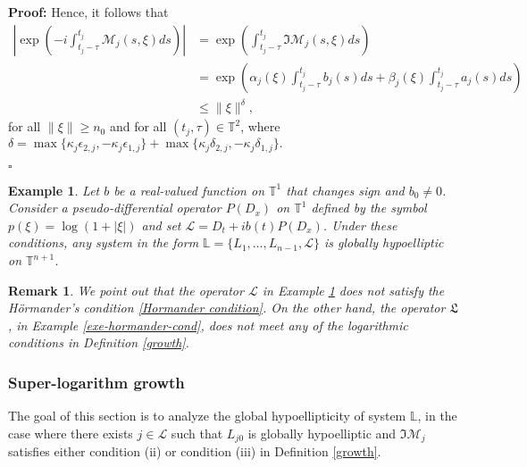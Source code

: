 \documentclass[12pt]{elsarticle}
\newtheorem{example}[theorem]{Example}
\newtheorem{remark}[theorem]{Remark}
\numberwithin{equation}{section}
\newenvironment{proof}[1][\noindent \textbf{Proof: }]{#1}{ \hfill $\square$ \vspace{2mm}}
\begin{document}
\begin{proof}
		Hence, it follows that
	\begin{align*}
	\left |
	\exp \left(-i\int_{t_j-\tau}^{t_j}\mathcal{M}_j(s,\xi)ds \right) 
	\right| 
	& = \exp \left(\int_{t_j-\tau}^{t_j}\Im \mathcal{M}_j(s,\xi)ds \right) \\
	& = 
	\exp \left({\alpha_j(\xi) \int_{t_j - \tau}^{t_j}b_j(s) ds} + {\beta_j(\xi) \int_{t_j - \tau}^{t_j}a_j(s) ds}\right) \\
	& \leq \|\xi\|^{\delta}, %
	\end{align*}
	for all $\|\xi\|\geq  n_{0}$  and for all $(t_j,\tau)\in\mathbb{T}^2$, where 
	$
	\delta = 
	\max\{\kappa_j \epsilon_{2,j}, -\kappa_j\epsilon_{1,j}\}+\max\{\kappa_j \delta_{2,j}, -\kappa_j\delta_{1,j}\}.
	$
	
	\end{proof}

\begin{example}\label{log grow example}
	Let $b$ be a real-valued function on $\mathbb{T}^1$ 
	that changes sign and  $b_0 \neq 0$. 	Consider a pseudo-differential operator $P(D_x)$ on $\mathbb{T}^1$ defined by the symbol $p(\xi) = \log(1+ |\xi|)$ and set $\mathscr{L}=D_t + ib(t)P(D_x) $. Under these conditions, any  system in the form $\mathbb{L} = \{L_1, \ldots, L_{n-1},\mathscr{L}\}$ is globally hypoelliptic on $\mathbb{T}^{n+1}$. 
\end{example}

\begin{remark}
	We point out that the operator $\mathscr{L}$ in Example \ref{log grow example} does not satisfy the H\"{o}rmander's  condition \eqref{Hormander condition}. On the other hand, the operator $\mathfrak{L}$, in Example \ref{exe-hormander-cond}, does not meet any of the logarithmic conditions in Definition \ref{growth}. 
\end{remark}






\subsubsection{Super-logarithm growth \label{sec-S-Log-cond}}

The goal of this section is to  analyze the global hypoellipticity of  system $\mathbb{L}$, in the case where there exists $j \in \mathcal{L}$ such that $L_{j0}$  is globally hypoelliptic and  $\Im\mathcal{M}_j$ satisfies either condition (ii) or condition (iii) in Defini\-tion \ref{growth}.
\end{document}
